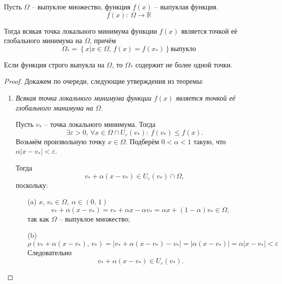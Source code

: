 \begin{theorem}
	Пусть $\Omega$ -- выпуклое множество, функция $f(x)$ -- выпуклая функция.
	\begin{equation*}
		f(x):\: \Omega \to \mathbb{R}
	\end{equation*}
	
	Тогда всякая точка локального минимума функции $f(x)$ является точкой её глобального минимума на $\Omega$, причём
	\begin{equation*}
		\Omega_* = \left\{x\big| x\in \Omega,\, f(x)=f(x_*)\right\} \text{выпукло}
	\end{equation*}
	
	Если функция строго выпукла на $\Omega$, то $\Omega_*$ содержит не более одной точки.
	
	\begin{proof}
		Докажем по очереди, следующие утверждения из теоремы:
		\begin{enumerate}[label=(\arabic*)]
		\item \textit{Всякая точка локального минимума функции $f(x)$ является точкой её глобального минимума на $\Omega$.}
		
		Пусть $v_*$ -- точка локального минимума. Тогда 
		\begin{equation*}
			\exists \varepsilon > 0,\, \forall x \in \Omega \cap U_\varepsilon(v_*):\:
			f(v_*)\leq f(x).
		\end{equation*}
		Возьмём произвольную точку $x\in\Omega$. Подберём $0<\alpha<1$ такую, что $\alpha \left|x-v_*\right|<\varepsilon$.
		
		Тогда
		\begin{equation*}
			v_* + \alpha(x-v_*) \in U_\varepsilon(v_*)\cap\Omega,
		\end{equation*}
		поскольку:
		\begin{itemize}
			\item[(a)] $x,\,v_*\in\Omega,\:\alpha\in\left(0,\,1\right)$
			\begin{equation*}
				v_* + \alpha(x-v_*) = v_* + \alpha x- \alpha v_* = \alpha x + (1-\alpha)v_*\in \Omega,
			\end{equation*}
			так как $\Omega$ -- выпуклое множество;
			\item[(b)]
			\begin{equation*}
				\rho(v_*+\alpha(x-v_*),\,v_*) = \left| v_* + \alpha(x-v_*) - v_* \right| = \left| \alpha(x-v_*) \right| = \alpha \left|x-v_*\right| < \varepsilon
			\end{equation*}
			Следовательно
			\begin{equation*}
				v_* + \alpha(x-v_*) \in U_\varepsilon(v_*).
			\end{equation*}
		\end{itemize}
		

\end{enumerate}
\end{proof}
\end{theorem}
